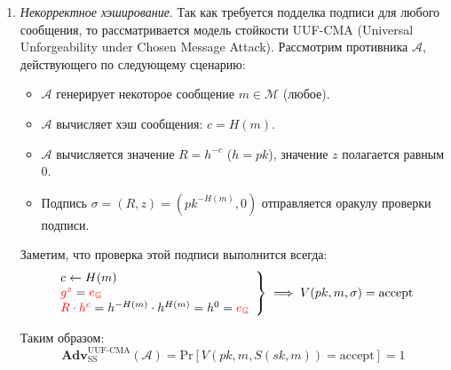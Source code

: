 \documentclass[12pt, a4paper]{extarticle}
\begin{document}
\begin{enumerate}
    \item \textit{Некорректное хэширование}. Так как требуется подделка подписи для любого сообщения, то рассматривается
        модель стойкости UUF-CMA (Universal Unforgeability under Chosen Message Attack). Рассмотрим противника $\mathcal{A}$,
        действующего по следующему сценарию:
        \begin{itemize}
            \item $\mathcal{A}$ генерирует некоторое сообщение $m \in \mathcal{M}$ (любое).
            
            \item $\mathcal{A}$ вычисляет хэш сообщения: $c = H(m)$.
            
            \item $\mathcal{A}$ вычисляется значение $R = h^{-c}$ ($h = pk$), значение $z$ полагается равным 0.
            
            \item Подпись $\sigma = (R, z) = (pk^{-H(m)}, 0)$ отправляется оракулу проверки подписи.
        \end{itemize}
        
        Заметим, что проверка этой подписи выполнится всегда:
        \begin{equation*}
            \left.\begin{array}{l}
                c \leftarrow H(m) \\
                \textcolor{red}{g^z} = \textcolor{red}{e_{\mathbb{G}}} \\
                \textcolor{red}{R \cdot h^c} = h^{-H(m)} \cdot h^{H(m)} = h^0 = 
                    \textcolor{red}{e_{\mathbb{G}}}
            \end{array}\right\} \implies V(pk, m, \sigma) = \text{accept}
        \end{equation*}
        
        Таким образом:
        \begin{equation*}
            \textbf{Adv}_{\text{SS}}^{\text{UUF-CMA}}(\mathcal{A}) = 
                \text{Pr}[V(pk, m, S(sk, m)) = \text{accept}] = 1
        \end{equation*}
        

\end{enumerate}
\end{document}
